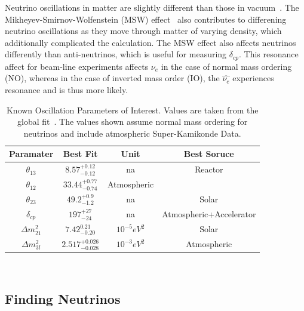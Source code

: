 Neutrino oscillations in matter are slightly different than those in vacuum~\citep{PhysRevD.17.2369}.
The Mikheyev-Smirnov-Wolfenstein (MSW) effect~\citep{Smirnov2004TheME} also contributes to differening neutrino oscillations as they move through matter of varying density, which additionally complicated the calculation.
The MSW effect also affects neutrinos differently than anti-neutrinos, which is useful for measuring $\delta_{cp}$.
This resonance affect for beam-line experiments affects $\nu_{e}$ in the case of normal mass ordering (NO), whereas in the case of inverted mass order (IO), the $\hat{\nu_{e}}$ experiences resonance and is thus more likely.

\begin{table}
\begin{center}
\begin{tabular}{||c c c c||}
 \hline
 Paramater & Best Fit & Unit & Best Soruce\\ [0.5ex]
 \hline\hline
  $\theta_{13}$ & $8.57^{+0.12}_{-0.12}$ & na & Reactor \\ %
 \hline
  $\theta_{12}$ & $33.44^{+0.77}_{-0.74}$ & Atmospheric \\ %
 \hline
  $\theta_{23}$ & $49.2^{+0.9}_{-1.2}$ & na & Solar \\ %
 \hline
  $\delta_{cp}$ & $197^{+27}_{-24}$ & na & Atmospheric+Accelerator \\ %
 \hline
  $\Delta m_{21}^{2}$ & $7.42^{0.21}_{-0.20}$ & $10^{-5}eV^{2}$ & Solar \\ %
 \hline
  $\Delta m_{3l}^{2}$ & $2.517^{+0.026}_{-0.028}$ & $10^{-3}eV^{2}$ & Atmospheric  \\
 \hline
\end{tabular}
\caption{Known Oscillation Parameters of Interest. Values are taken from the global fit~\citep{2020JHEP...09..178E}. The values shown assume normal mass ordering for neutrinos and include atmospheric Super-Kamikonde Data.}
\end{center}
\end{table}
~\label{table:pmns_params}

\subsection{Finding Neutrinos}
~\label{sec:neutrinos}

